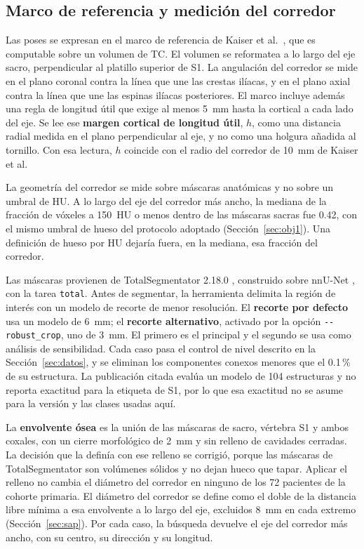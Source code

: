\subsection{Marco de referencia y medición del corredor}\label{sec:corredor}

Las poses se expresan en el marco de referencia de Kaiser et al.~\cite{kaiser2014dysmorphism}, que es computable sobre un volumen de TC. El volumen se reformatea a lo largo del eje sacro, perpendicular al platillo superior de S1. La angulación del corredor se mide en el plano coronal contra la línea que une las crestas ilíacas, y en el plano axial contra la línea que une las espinas ilíacas posteriores. El marco incluye además una regla de longitud útil que exige al menos 5~mm hasta la cortical a cada lado del eje. Se lee ese \textbf{margen cortical de longitud útil}, $h$, como una distancia radial medida en el plano perpendicular al eje, y no como una holgura añadida al tornillo. Con esa lectura, $h$ coincide con el radio del corredor de 10~mm de Kaiser et al.

La geometría del corredor se mide sobre máscaras anatómicas y no sobre un umbral de HU. A lo largo del eje del corredor más ancho, la mediana de la fracción de vóxeles a 150~HU o menos dentro de las máscaras sacras fue 0.42, con el mismo umbral de hueso del protocolo adoptado (Sección~\ref{sec:obj1}). Una definición de hueso por HU dejaría fuera, en la mediana, esa fracción del corredor.

Las máscaras provienen de TotalSegmentator 2.18.0 \cite{wasserthal2023}, construido sobre nnU-Net \cite{isensee2021}, con la tarea \texttt{total}. Antes de segmentar, la herramienta delimita la región de interés con un modelo de recorte de menor resolución. El \textbf{recorte por defecto} usa un modelo de 6~mm; el \textbf{recorte alternativo}, activado por la opción \texttt{-{}-robust\_crop}, uno de 3~mm. El primero es el principal y el segundo se usa como análisis de sensibilidad. Cada caso pasa el control de nivel descrito en la Sección~\ref{sec:datos}, y se eliminan los componentes conexos menores que el 0.1\,\% de su estructura. La publicación citada evalúa un modelo de 104 estructuras y no reporta exactitud para la etiqueta de S1, por lo que esa exactitud no se asume para la versión y las clases usadas aquí.

La \textbf{envolvente ósea} es la unión de las máscaras de sacro, vértebra S1 y ambos coxales, con un cierre morfológico de 2~mm y sin relleno de cavidades cerradas. La decisión que la definía con ese relleno se corrigió, porque las máscaras de TotalSegmentator son volúmenes sólidos y no dejan hueco que tapar. Aplicar el relleno no cambia el diámetro del corredor en ninguno de los 72 pacientes de la cohorte primaria. El diámetro del corredor se define como el doble de la distancia libre mínima a esa envolvente a lo largo del eje, excluidos 8~mm en cada extremo (Sección~\ref{sec:sap}). Por cada caso, la búsqueda devuelve el eje del corredor más ancho, con su centro, su dirección y su longitud.

